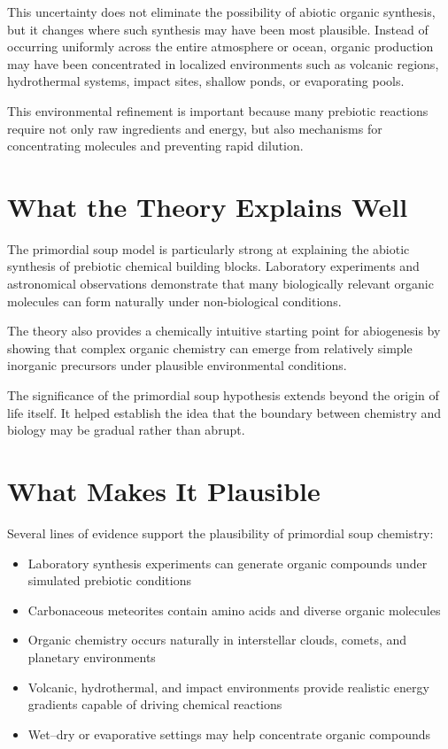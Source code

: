 \documentclass[
  oneside]{book}
\providecommand{\tightlist}{%
  \setlength{\itemsep}{0pt}\setlength{\parskip}{0pt}}
\begin{document}
This uncertainty does not eliminate the possibility of abiotic organic synthesis, but it changes where such synthesis may have been most plausible. Instead of occurring uniformly across the entire atmosphere or ocean, organic production may have been concentrated in localized environments such as volcanic regions, hydrothermal systems, impact sites, shallow ponds, or evaporating pools.

This environmental refinement is important because many prebiotic reactions require not only raw ingredients and energy, but also mechanisms for concentrating molecules and preventing rapid dilution.

\section{What the Theory Explains Well}\label{what-the-theory-explains-well}

The primordial soup model is particularly strong at explaining the abiotic synthesis of prebiotic chemical building blocks. Laboratory experiments and astronomical observations demonstrate that many biologically relevant organic molecules can form naturally under non-biological conditions.

The theory also provides a chemically intuitive starting point for abiogenesis by showing that complex organic chemistry can emerge from relatively simple inorganic precursors under plausible environmental conditions.

The significance of the primordial soup hypothesis extends beyond the origin of life itself. It helped establish the idea that the boundary between chemistry and biology may be gradual rather than abrupt.

\section{What Makes It Plausible}\label{what-makes-it-plausible}

Several lines of evidence support the plausibility of primordial soup chemistry:

\begin{itemize}
\tightlist
\item
  Laboratory synthesis experiments can generate organic compounds under simulated prebiotic conditions
\item
  Carbonaceous meteorites contain amino acids and diverse organic molecules
\item
  Organic chemistry occurs naturally in interstellar clouds, comets, and planetary environments
\item
  Volcanic, hydrothermal, and impact environments provide realistic energy gradients capable of driving chemical reactions
\item
  Wet--dry or evaporative settings may help concentrate organic compounds
\end{itemize}
\end{document}
